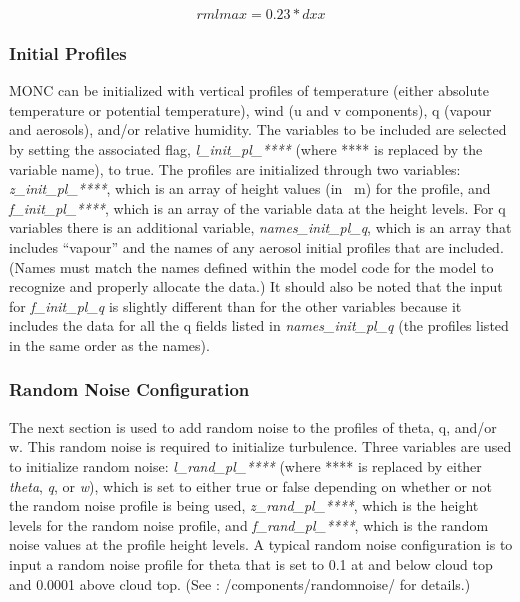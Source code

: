 \begin{equation} \label{eq:rmlmax}
rmlmax = 0.23 * dxx
\end{equation}

\subsubsection{Initial Profiles}
MONC can be initialized with vertical profiles of temperature (either absolute temperature or potential temperature), wind (u and v components), q (vapour and aerosols), and/or relative humidity. The variables to be included are selected by setting the associated flag, \textit{l\_init\_pl\_****} (where **** is replaced by the variable name), to true. The profiles are initialized through two variables: \textit{z\_init\_pl\_****}, which is an array of height values (in \SI{}{m}) for the profile, and \textit{f\_init\_pl\_****}, which is an array of the variable data at the height levels. For q variables there is an additional variable, \textit{names\_init\_pl\_q}, which is an array that includes ``vapour'' and the names of any aerosol initial profiles that are included. (Names must match the names defined within the model code for the model to recognize and properly allocate the data.) It should also be noted that the input for \textit{f\_init\_pl\_q} is slightly different than for the other variables because it includes the data for all the q fields listed in \textit{names\_init\_pl\_q} (the profiles listed in the same order as the names). \citep{moncCode}

\subsubsection{Random Noise Configuration}
The next section is used to add random noise to the profiles of theta, q, and/or w. This random noise is required to initialize turbulence. Three variables are used to initialize random noise: \textit{l\_rand\_pl\_****} (where **** is replaced by either \textit{theta}, \textit{q}, or \textit{w}), which is set to either true or false depending on whether or not the random noise profile is being used, \textit{z\_rand\_pl\_****}, which is the height levels for the random noise profile, and \textit{f\_rand\_pl\_****}, which is the random noise values at the profile height levels. A typical random noise configuration is to input a random noise profile for theta that is set to 0.1 at and below cloud top and 0.0001 above cloud top. (See \cite{moncCode}: /components/randomnoise/ for details.)

